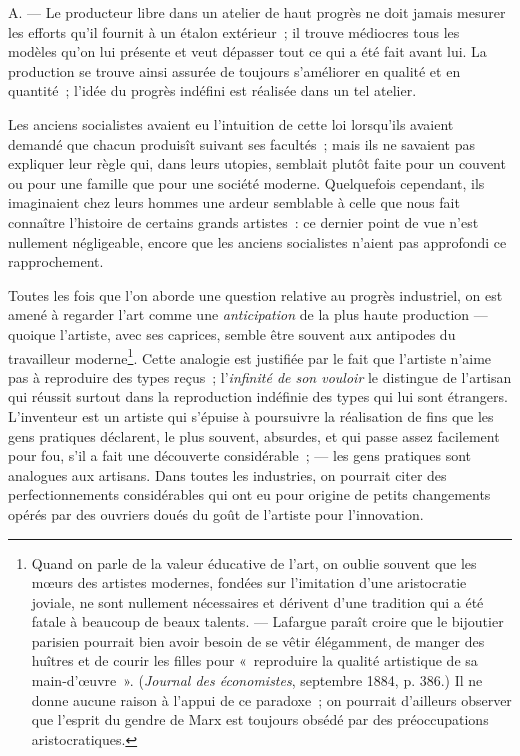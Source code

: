 \documentclass[french,twoside]{book} %
\begin{document}
\noindent A. — Le producteur libre dans un atelier de haut progrès ne doit jamais mesurer les efforts qu’il fournit à un étalon extérieur ; il trouve médiocres tous les modèles qu’on lui présente et veut dépasser tout ce qui a été fait avant lui. La production se trouve ainsi assurée de toujours s’améliorer en qualité et en quantité ; l’idée du progrès indéfini est réalisée dans un tel atelier.\par
Les anciens socialistes avaient eu l’intuition de cette loi lorsqu’ils avaient demandé que chacun produisît suivant ses facultés ; mais ils ne savaient pas expliquer leur règle qui, dans leurs utopies, semblait plutôt faite pour un couvent ou pour une famille que pour une société moderne. Quelquefois cependant, ils imaginaient chez leurs hommes une ardeur semblable à celle que nous fait connaître l’histoire de certains grands artistes : ce dernier point de vue n’est nullement négligeable, encore que les anciens socialistes n’aient pas approfondi ce rapprochement.\par
 Toutes les fois que l’on aborde une question relative au progrès industriel, on est amené à regarder l’art comme une \emph{anticipation} de la plus haute production — quoique l’artiste, avec ses caprices, semble être souvent aux antipodes du travailleur moderne\footnote{ \noindent Quand on parle de la valeur éducative de l’art, on oublie souvent que les mœurs des artistes modernes, fondées sur l’imitation d’une aristocratie joviale, ne sont nullement nécessaires et dérivent d’une tradition qui a été fatale à beaucoup de beaux talents. — Lafargue paraît croire que le bijoutier parisien pourrait bien avoir besoin de se vêtir élégamment, de manger des huîtres et de courir les filles pour « reproduire la qualité artistique de sa main-d’œuvre ». (\emph{Journal des économistes}, septembre 1884, p. 386.) Il ne donne aucune raison à l’appui de ce paradoxe ; on pourrait d’ailleurs observer que l’esprit du gendre de Marx est toujours obsédé par des préoccupations aristocratiques.
 }. Cette analogie est justifiée par le fait que l’artiste n’aime pas à reproduire des types reçus ; l’\emph{infinité de son vouloir} le distingue de l’artisan qui réussit surtout dans la reproduction indéfinie des types qui lui sont étrangers. L’inventeur est un artiste qui s’épuise à poursuivre la réalisation de fins que les gens pratiques déclarent, le plus souvent, absurdes, et qui passe assez facilement pour fou, s’il a fait une découverte considérable ; — les gens pratiques sont analogues aux artisans. Dans toutes les industries, on pourrait citer des perfectionnements considérables qui ont eu pour origine de petits changements opérés par des ouvriers doués du goût de l’artiste pour l’innovation.\par
\end{document}
